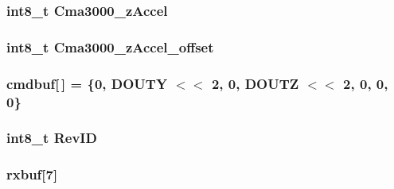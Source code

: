 \hypertarget{group__HAL__Cma3000_ga862a9e332db3dc346369fb5fc4ef2e07}{
\subsubsection[{Cma3000\-\_\-z\-Accel}]{\setlength{\rightskip}{0pt plus 5cm}int8\-\_\-t Cma3000\-\_\-z\-Accel}}\label{group__HAL__Cma3000_ga862a9e332db3dc346369fb5fc4ef2e07}
\hypertarget{group__HAL__Cma3000_gaeed4d3e43f6b93fad6b1a8176f3b4ef5}{
\subsubsection[{Cma3000\-\_\-z\-Accel\-\_\-offset}]{\setlength{\rightskip}{0pt plus 5cm}int8\-\_\-t Cma3000\-\_\-z\-Accel\-\_\-offset}}\label{group__HAL__Cma3000_gaeed4d3e43f6b93fad6b1a8176f3b4ef5}
\hypertarget{group__HAL__Cma3000_gab3dbd75bdfcd17ed7daed83b67e55d25}{
\subsubsection[{cmdbuf}]{ cmdbuf\mbox{[}$\,$\mbox{]} = \{0, {\bf D\-O\-U\-T\-Y} $<$$<$ 2, 0, {\bf D\-O\-U\-T\-Z} $<$$<$ 2, 0, 0, 0\}}}\label{group__HAL__Cma3000_gab3dbd75bdfcd17ed7daed83b67e55d25}
\hypertarget{group__HAL__Cma3000_gab84df94ff0cd4d502b2faae204b4d24f}{
\subsubsection[{Rev\-I\-D}]{\setlength{\rightskip}{0pt plus 5cm}int8\-\_\-t Rev\-I\-D}}\label{group__HAL__Cma3000_gab84df94ff0cd4d502b2faae204b4d24f}
\hypertarget{group__HAL__Cma3000_gaacf8a00ccb887c06968f98f27def8716}{
\subsubsection[{rxbuf}]{ rxbuf\mbox{[}7\mbox{]}}}\label{group__HAL__Cma3000_gaacf8a00ccb887c06968f98f27def8716}
